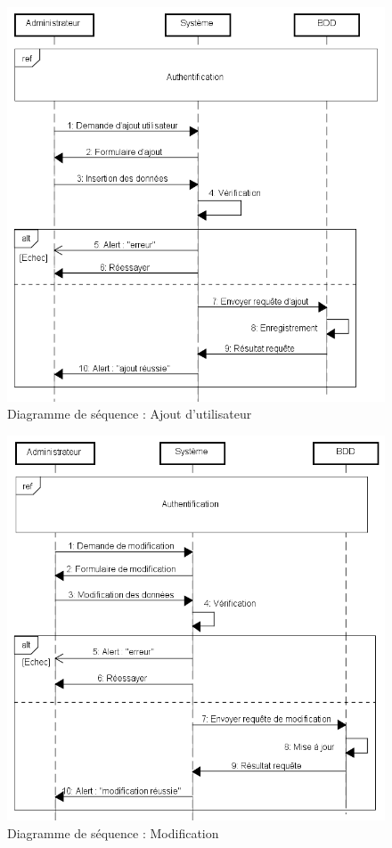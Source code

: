 \begin{figure}[h]
	\centering
	\includegraphics[width=1\linewidth]{"Chapitre3/images/sd/Ajout d'utilsateur"}
	\caption{Diagramme de séquence : Ajout d'utilisateur}
	\label{Diagramme de séquence : Ajout d'utilisateur}
\end{figure}

\begin{figure}[h]
	\centering
	\includegraphics[width=1\linewidth]{"Chapitre3/images/sd/Modification"}
	\caption{Diagramme de séquence : Modification}
	\label{Diagramme de séquence : Modification}
\end{figure}

